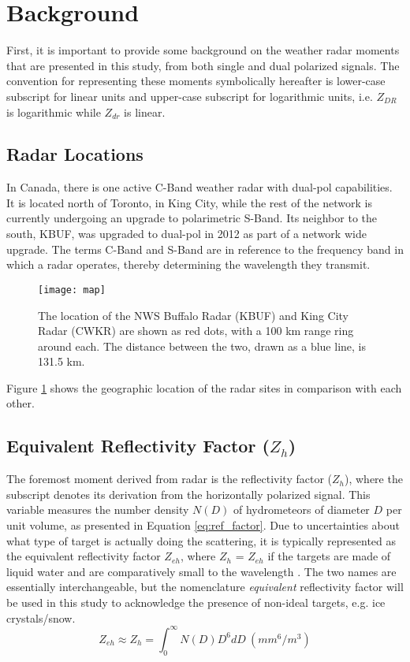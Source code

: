 \section{Background}
First, it is important to provide some background on the weather radar moments that are presented in this study, from both single and dual polarized signals.
The convention for representing these moments symbolically hereafter is lower-case subscript for linear units and upper-case subscript for logarithmic units,
i.e. $Z_{DR}$ is logarithmic while $Z_{dr}$ is linear.
\subsection{Radar Locations}
In Canada, there is one active C-Band weather radar with dual-pol capabilities. It is located north of Toronto, in King City, while the rest of the network is
currently undergoing an upgrade to polarimetric S-Band. Its neighbor to the south, KBUF, was upgraded to dual-pol in 2012 as part of a network wide upgrade. The terms C-Band and S-Band are in reference to the frequency band in which a radar operates, thereby determining the wavelength they transmit. 
\begin{figure}[h]
\texttt{[image: map]}
\caption{The location of the NWS Buffalo Radar (KBUF) and King City Radar (CWKR) are shown as red dots, with a 100 km range ring around each. The distance
between the two, drawn as a blue line, is 131.5 km.} 
\label{map}
\end{figure}
Figure \ref{map} shows the geographic location of the radar sites in comparison with each other.
\subsection{Equivalent Reflectivity Factor ($Z_{h}$)}
The foremost moment derived from radar is the reflectivity factor ($Z_{h}$), where the
subscript denotes its derivation from the horizontally polarized signal. This variable
measures the number density $N(D)$ of hydrometeors of diameter $D$ per unit volume, as
presented in Equation \ref{eq:ref_factor}. Due to uncertainties about what type of
target is actually doing the scattering, it is typically represented as the equivalent
reflectivity factor $Z_{eh}$, where $Z_{h}$ = $Z_{eh}$ if the targets are made of liquid 
water and are comparatively small to the wavelength \citep{Fabry2015}. The two names are 
essentially interchangeable, but the nomenclature \textit{equivalent} reflectivity factor will be used in this
study to acknowledge the presence of non-ideal targets, e.g. ice crystals/snow.
\begin{equation}\label{eq:ref_factor}
Z_{eh} \approx Z_{h} = \int_0^{\infty} N(D)D^6dD \ (mm^6/m^3)
\end{equation}
